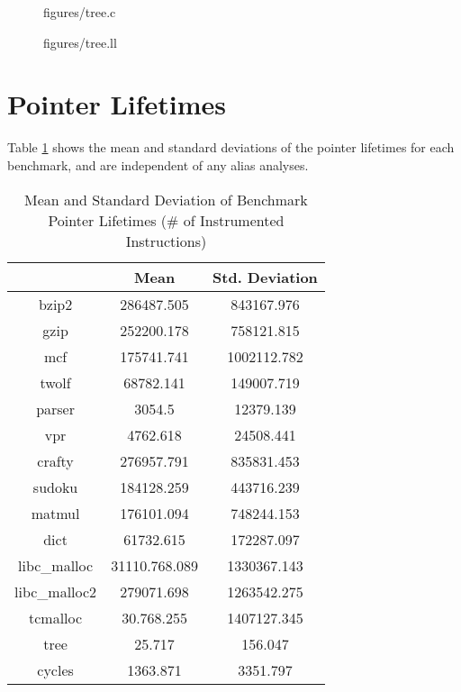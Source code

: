\begin{figure} [h]
   {figures/tree.c}
  \label{fig:treec}
\end{figure}

\begin{figure} [h]
   {figures/tree.ll}
  \label{fig:treell}
\end{figure}

\section{Pointer Lifetimes}
Table \ref{table:4} shows the mean and standard deviations of the pointer lifetimes for each benchmark, and are independent of any alias analyses.

\begin{table} [h!]
\centering
   \begin{tabular} {|c|c c|}
      \hline
      & Mean & Std. Deviation \\
      \hline
	   bzip2 & 286487.505 & 843167.976 \\
      \hline
	   gzip & 252200.178 & 758121.815 \\
      \hline
           mcf & 175741.741 & 1002112.782 \\
      \hline
	   twolf & 68782.141 & 149007.719 \\
      \hline
	   parser & 3054.5 & 12379.139 \\
      \hline
	   vpr & 4762.618 & 24508.441 \\
      \hline
	   crafty & 276957.791 & 835831.453 \\
      \hline
	   sudoku & 184128.259 & 443716.239 \\
      \hline
	   matmul & 176101.094 & 748244.153 \\
      \hline
	   dict & 61732.615 & 172287.097 \\
      \hline
	   libc\_malloc & 31110.768.089 & 1330367.143 \\
      \hline
	   libc\_malloc2 & 279071.698 & 1263542.275 \\
      \hline
	   tcmalloc & 30.768.255 & 1407127.345 \\
      \hline
	   tree & 25.717 & 156.047 \\
      \hline
	   cycles & 1363.871 & 3351.797 \\
      \hline
   \end{tabular}
   \caption{Mean and Standard Deviation of Benchmark Pointer Lifetimes (# of Instrumented Instructions)}
   \label{table:4}
\end{table}

